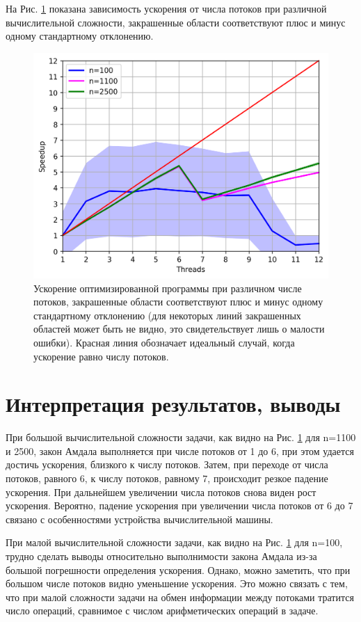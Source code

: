 \documentclass[12pt]{article}
\begin{document}
На Рис. \ref{fig:speedup_vs_threads} показана зависимость ускорения от числа потоков при различной вычислительной сложности, закрашенные области соответствуют плюс и минус одному стандартному отклонению.
\begin{figure}[htbp]
    \centering
    \includegraphics[scale=0.75]{speedup_vs_threads.png}
    \caption{Ускорение оптимизированной программы при различном числе потоков, закрашенные области соответствуют плюс и минус одному стандартному отклонению (для некоторых линий закрашенных областей может быть не видно, это свидетельствует лишь о малости ошибки). Красная линия обозначает идеальный случай, когда ускорение равно числу потоков.}
    \label{fig:speedup_vs_threads}
\end{figure}

\section{Интерпретация результатов, выводы}

При большой вычислительной сложности задачи, как видно на Рис. \ref{fig:speedup_vs_threads} для n=1100 и 2500, закон Амдала выполняется при числе потоков от 1 до 6, при этом удается достичь ускорения, близкого к числу потоков. Затем, при переходе от числа потоков, равного 6, к числу потоков, равному 7, происходит резкое падение ускорения. При дальнейшем увеличении числа потоков снова виден рост ускорения. Вероятно, падение ускорения при увеличении числа потоков от 6 до 7 связано с особенностями устройства вычислительной машины.

При малой вычислительной сложности задачи, как видно на Рис. \ref{fig:speedup_vs_threads} для n=100, трудно сделать выводы относительно выполнимости закона Амдала из-за большой погрешности определения ускорения. Однако, можно заметить, что при большом числе потоков видно уменьшение ускорения. Это можно связать с тем, что при малой сложности задачи на обмен информации между потоками тратится число операций, сравнимое с числом арифметических операций в задаче.
\end{document}
